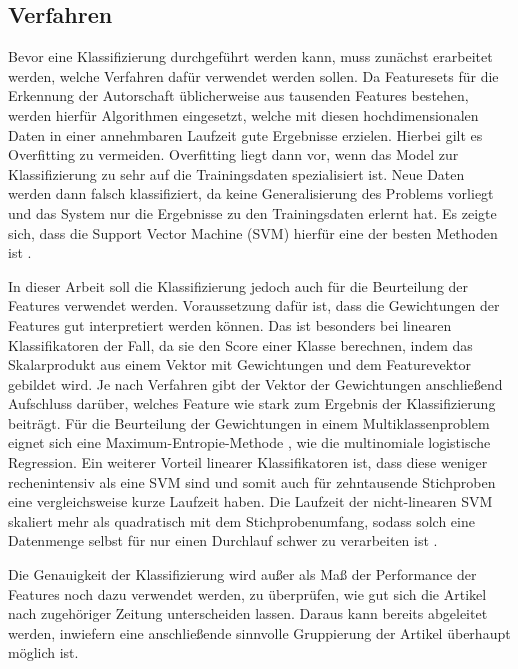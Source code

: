 \subsection{Verfahren}
Bevor eine Klassifizierung durchgeführt werden kann, muss zunächst erarbeitet werden, welche Verfahren dafür verwendet werden sollen. Da Featuresets für die Erkennung der Autorschaft üblicherweise aus tausenden Features bestehen, werden hierfür Algorithmen eingesetzt, welche mit diesen hochdimensionalen Daten in einer annehmbaren Laufzeit gute Ergebnisse erzielen. Hierbei gilt es Overfitting zu vermeiden. Overfitting liegt dann vor, wenn das Model zur Klassifizierung zu sehr auf die Trainingsdaten spezialisiert ist. Neue Daten werden dann falsch klassifiziert, da keine Generalisierung des Problems vorliegt und das System nur die Ergebnisse zu den Trainingsdaten erlernt hat. Es zeigte sich, dass die Support Vector Machine (SVM) hierfür eine der besten Methoden ist \cite{li2006fingerprint, stamatatos2009survey}.

In dieser Arbeit soll die Klassifizierung jedoch auch für die Beurteilung der Features verwendet werden. Voraussetzung dafür ist, dass die Gewichtungen der Features gut interpretiert werden können. Das ist besonders bei linearen Klassifikatoren der Fall, da sie den Score einer Klasse berechnen, indem das Skalarprodukt aus einem Vektor mit Gewichtungen und dem Featurevektor gebildet wird. Je nach Verfahren gibt der Vektor der Gewichtungen anschließend Aufschluss darüber, welches Feature wie stark zum Ergebnis der Klassifizierung beiträgt. Für die Beurteilung der Gewichtungen in einem Multiklassenproblem eignet sich eine Maximum-Entropie-Methode \cite[K.~2]{cimino2017identifying}, wie die multinomiale logistische Regression. Ein weiterer Vorteil linearer Klassifikatoren ist, dass diese weniger rechenintensiv als eine SVM sind und somit auch für zehntausende Stichproben eine vergleichsweise kurze Laufzeit haben. Die Laufzeit der nicht-linearen SVM skaliert mehr als quadratisch mit dem Stichprobenumfang, sodass solch eine Datenmenge selbst für nur einen Durchlauf schwer zu verarbeiten ist \cite[Seite: sklearn.svm.SVC]{scikitlearnAPIReference}.

Die Genauigkeit der Klassifizierung wird außer als Maß der Performance der Features noch dazu verwendet werden, zu überprüfen, wie gut sich die Artikel nach zugehöriger Zeitung  unterscheiden lassen. Daraus kann bereits abgeleitet werden, inwiefern eine anschließende sinnvolle Gruppierung der Artikel überhaupt möglich ist.

